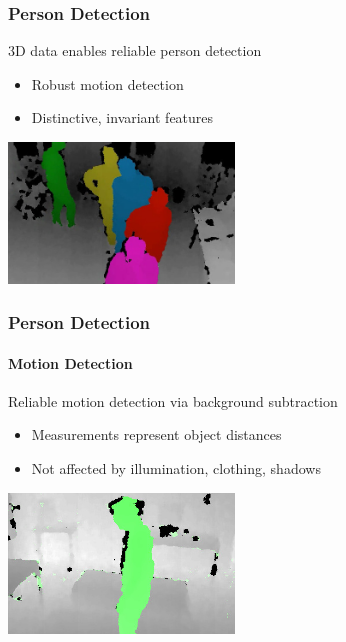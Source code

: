 \documentclass[xetex,professionalfont]{beamer}
\begin{document}
\begin{frame}
\frametitle{Person Detection}

3D data enables reliable person detection
\begin{itemize}
    \item Robust motion detection
	\item Distinctive, invariant features %
\end{itemize}

\begin{center}
\includegraphics[width=6cm]{figures/person-detection.jpg}
\end{center}

\end{frame}


\begin{frame}
\frametitle{Person Detection}
\framesubtitle{Motion Detection}

Reliable motion detection via background subtraction
\begin{itemize}
    \item Measurements represent object distances %
    \item Not affected by illumination, clothing, shadows %
\end{itemize}

\begin{center}
\includegraphics[width=6cm]{figures/fearless-depth.jpg}
\end{center}

\end{frame}
\end{document}
